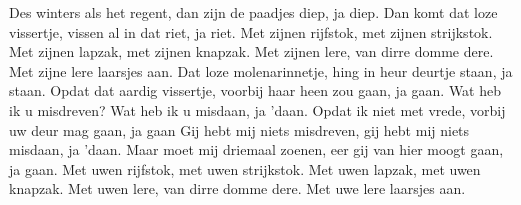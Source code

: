 \beginverse
Des winters als het regent, dan zijn de paadjes diep, ja diep.
Dan komt dat loze vissertje, vissen al in dat riet, ja riet.
\endverse
\beginchorus
Met zijnen rijfstok, met zijnen strijkstok.
Met zijnen lapzak, met zijnen knapzak.
Met zijnen lere, van dirre domme dere.
Met zijne lere laarsjes aan. 
\endchorus
\beginverse
Dat loze molenarinnetje, hing in heur deurtje staan, ja staan.
Opdat dat aardig vissertje, voorbij haar heen zou gaan, ja gaan.
\endverse
\beginverse
Wat heb ik u misdreven? Wat heb ik u misdaan, ja 'daan.
Opdat ik niet met vrede, vorbij uw deur mag gaan, ja gaan
\endverse
\beginverse
Gij hebt mij niets misdreven, gij hebt mij niets misdaan, ja 'daan.
Maar moet mij driemaal zoenen, eer gij van hier moogt gaan, ja gaan.
\endverse
\beginchorus
Met uwen rijfstok, met uwen strijkstok.
Met uwen lapzak, met uwen knapzak.
Met uwen lere, van dirre domme dere.
Met uwe lere laarsjes aan. 
\endchorus
\endsong